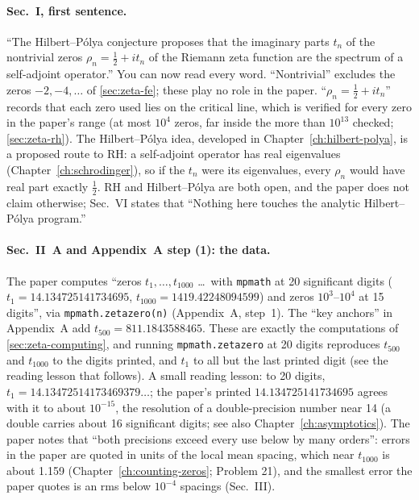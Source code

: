 \paragraph{Sec.~I, first sentence.} ``The Hilbert--P\'olya conjecture proposes that the imaginary parts $t_n$ of the nontrivial zeros $\rho_n=\tfrac12+it_n$ of the Riemann zeta function are the spectrum of a self-adjoint operator.'' You can now read every word. ``Nontrivial'' excludes the zeros $-2,-4,\dots$ of \cref{sec:zeta-fe}; these play no role in the paper. ``$\rho_n=\tfrac12+it_n$'' records that each zero used lies on the critical line, which is verified for every zero in the paper's range (at most $10^4$ zeros, far inside the more than $10^{13}$ checked; \cref{sec:zeta-rh}). The Hilbert--P\'olya idea, developed in Chapter~\ref{ch:hilbert-polya}, is a proposed route to RH: a self-adjoint operator has real eigenvalues (Chapter~\ref{ch:schrodinger}), so if the $t_n$ were its eigenvalues, every $\rho_n$ would have real part exactly $\tfrac12$. RH and Hilbert--P\'olya are both open, and the paper does not claim otherwise; Sec.~VI states that ``Nothing here touches the analytic Hilbert--P\'olya program.''

\paragraph{Sec.~II~A and Appendix~A step (1): the data.} The paper computes ``zeros $t_1,\dots,t_{1000}$ \dots\ with \texttt{mpmath} at 20 significant digits ($t_1=14.134725141734695$, $t_{1000}=1419.42248094599$) and zeros $10^3$--$10^4$ at 15 digits'', via \texttt{mpmath.zetazero(n)} (Appendix~A, step~1). The ``key anchors'' in Appendix~A add $t_{500}=811.1843588465$. These are exactly the computations of \cref{sec:zeta-computing}, and running \texttt{mpmath.zetazero} at 20 digits reproduces $t_{500}$ and $t_{1000}$ to the digits printed, and $t_1$ to all but the last printed digit (see the reading lesson that follows). A small reading lesson: to 20 digits, $t_1=14.13472514173469379\ldots$; the paper's printed $14.134725141734695$ agrees with it to about $10^{-15}$, the resolution of a double-precision number near 14 (a double carries about 16 significant digits; see also Chapter~\ref{ch:asymptotics}). The paper notes that ``both precisions exceed every use below by many orders'': errors in the paper are quoted in units of the local mean spacing, which near $t_{1000}$ is about 1.159 (Chapter~\ref{ch:counting-zeros}; Problem 21), and the smallest error the paper quotes is an rms below $10^{-4}$ spacings (Sec.~III).

